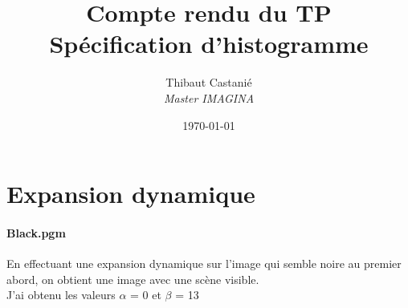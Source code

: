 \documentclass[a4paper,11pt]{article}
\begin{document}
\title{\textbf{Compte rendu du TP }\\Spécification d'histogramme}
\author{Thibaut Castanié\\\textit{Master IMAGINA}}
\date{\today}

\maketitle
\thispagestyle{empty}

\newpage 

\section{Expansion dynamique}
\paragraph{Black.pgm} En effectuant une expansion dynamique sur l'image qui semble noire au premier abord, on obtient une image avec une scène visible.
\\J'ai obtenu les valeurs $\alpha$ = 0 et $\beta$ = 13
\end{document}
